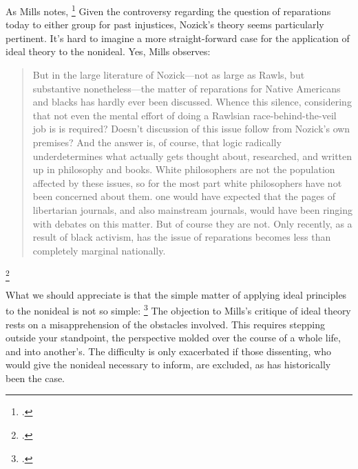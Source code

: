 \documentclass[letterpaper,notitlepage,12pt]{article}
\begin{document}
As Mills notes, \footcite[p. 180]{mills_ideal_2005}
Given the controversy regarding the question of reparations today to either
group for past injustices, Nozick's theory seems particularly pertinent.
It's hard to imagine a more straight-forward case for the application of ideal 
theory to the nonideal.
Yes, Mills observes: \blockquote{But in the large literature of Nozick---not as
  large as Rawls, but substantive nonetheless---the matter of reparations for
  Native Americans and blacks has hardly ever been discussed. Whence this
  silence, considering that not even the mental effort of doing a Rawlsian
  race-behind-the-veil job is is required? Doesn't discussion of this issue
   follow from Nozick's own premises? And the answer is, of
  course, that logic radically underdetermines what actually gets thought about,
  researched, and written up in philosophy and books. White philosophers are not
  the population affected by these issues, so for the most part white
  philosophers have not been concerned about them.  one would
  have expected that the pages of libertarian journals, and also mainstream
  journals, would have been ringing with debates on this matter. But of course
  they are not. Only recently, as a result of black activism, has the issue of
reparations becomes less than completely marginal
nationally.}\footcite[p.180]{mills_ideal_2005}

What we should appreciate is that the simple matter of applying ideal principles
to the nonideal is not so simple: \footcite[p. 178]{mills_ideal_2005}
The objection to Mills's critique of ideal theory rests on a misapprehension of
the obstacles involved.
This requires stepping outside your standpoint, the perspective molded over the
course of a whole life, and into another's.
The difficulty is only exacerbated if those dissenting, who would give the
nonideal necessary to inform, are excluded, as has historically been the case.
\end{document}
